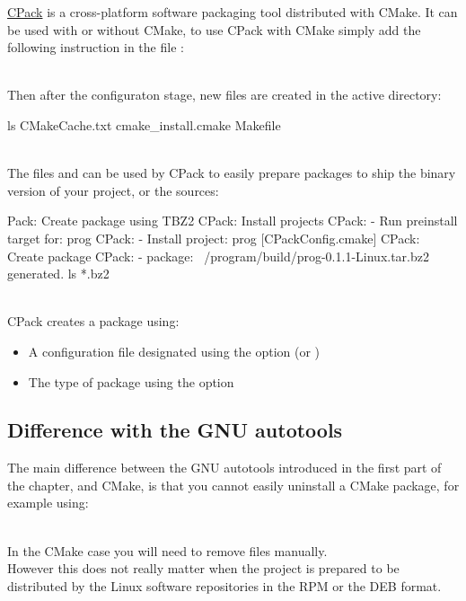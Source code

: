 \href{https://cmake.org/cmake/help/book/mastering-cmake/chapter/Packaging\%20With\%20CPack.html}{CPack} is a cross-platform software packaging tool distributed with CMake. 
It can be used with or without CMake, to use CPack with CMake simply add the following instruction in the file :
\begin{script}
\end{script}
\\[-0.5cm]
\noindent Then after the configuraton stage, new files are created in the active directory: 
\begin{script}
 ls 
CMakeCache.txt                         cmake_install.cmake  
    Makefile
\end{script}\\[-0.5cm]
The files  and  can be used by CPack to easily prepare packages to ship the binary version of your project, or the sources: 
\begin{script}
     
Pack: Create package using TBZ2
CPack: Install projects
CPack: - Run preinstall target for: prog
CPack: - Install project: prog [CPackConfig.cmake]
CPack: Create package
CPack: - package: ~/program/build/prog-0.1.1-Linux.tar.bz2 generated.
 ls *.bz2
\end{script}
\\[-0.5cm]
CPack creates a package using: 
\begin{itemize}
\item A configuration file designated using the option  (or )
\item The type of package using the option 
\end{itemize}

\subsection{Difference with the GNU autotools}

The main difference between the GNU autotools introduced in the first part of the chapter, and CMake, 
is that you cannot easily uninstall a CMake package, for example using: 
\begin{script}
   
\end{script}
\\[-0.5cm]
In the CMake case you will need to remove files manually. \\[0.25cm]
However this does not really matter when the project is prepared to be distributed by the Linux software repositories in the RPM or the DEB format. 


